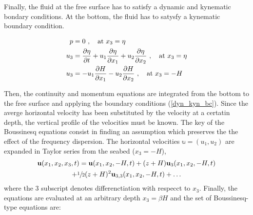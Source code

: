 Finally, the fluid at the free surface has to satisfy a dynamic and kynematic bondary conditions. At the bottom, the fluid has to satysfy a kynematic boundary condition.

\begin{equation}\label{dyn_kyn_bc}
\begin{split}
p &= 0 \ , \quad \text{at } x_3=\eta \\
u_3 &= \frac{\partial\eta}{\partial t} + u_1 \frac{\partial\eta}{\partial x_1}  + u_2 \frac{\partial\eta}{\partial x_2} \ , \quad \text{at } x_3=\eta \\
u_3 &= -u_1 \frac{\partial H}{\partial x_1} -u_2 \frac{\partial H}{\partial x_2} \ , \quad \text{at } x_3=-H
\end{split}
\end{equation}

Then, the continuity and momentum equations are integrated from the bottom to the free surface and applying the boundary conditions (\ref{dyn_kyn_bc}). Since the averge horizontal velocity has been substituted by the velocity at a certatin depth, the vertical profile of the velocities must be known. The key of the Boussinesq equations consist in finding an assumption which preserves the the effect of the frequency dispersion. The horizontal velocities $\mathbb{u}=(u_1, u_2)$ are expanded in Taylor series from the seabed ($x_3=-H$),
\begin{multline} \label{seabed_taylor_expansion}
    \mathbf{u}(x_1,x_2,x_3,t) = \mathbf{u}(x_1,x_2,-H,t) + (z+H)\mathbf{u}_3(x_1,x_2,-H,t) \\ + \sfrac{1}{2}(z+H)^2\mathbf{u}_{3,3}(x_1,x_2,-H,t) + \dots
\end{multline}
where the $3$ subscript denotes differenctiation with respecct to $x_3$.
Finally, the equations are evaluated at an arbitrary depth $x_3=\beta H$ and the set of Boussinesq-type equations are:

